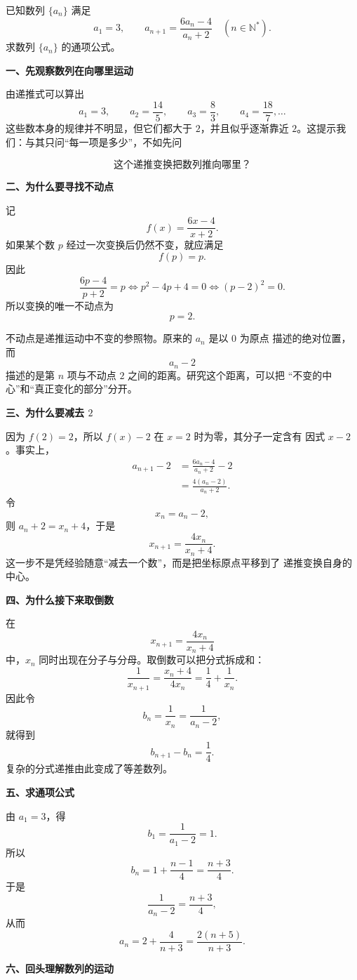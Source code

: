 \documentclass[zihao=-4]{exam-zh}
\begin{document}
\begin{question}[points=12]
已知数列 $\{a_n\}$ 满足
\[
 a_1=3,\qquad
 a_{n+1}=\frac{6a_n-4}{a_n+2}\quad(n\in\mathbb N^*).
\]
求数列 $\{a_n\}$ 的通项公式。

\begin{solution}
\textbf{一、先观察数列在向哪里运动}

由递推式可以算出
\[
 a_1=3,\qquad
 a_2=\frac{14}{5},\qquad
 a_3=\frac83,\qquad
 a_4=\frac{18}{7},\ldots
\]
这些数本身的规律并不明显，但它们都大于 $2$，并且似乎逐渐靠近
$2$。这提示我们：与其只问“每一项是多少”，不如先问

\[
 \text{这个递推变换把数列推向哪里？}
\]

\medskip
\textbf{二、为什么要寻找不动点}

记
\[
 f(x)=\frac{6x-4}{x+2}.
\]
如果某个数 $p$ 经过一次变换后仍然不变，就应满足
\[
 f(p)=p.
\]
因此
\[
 \frac{6p-4}{p+2}=p
 \iff p^2-4p+4=0
 \iff (p-2)^2=0.
\]
所以变换的唯一不动点为
\[
 \boxed{p=2}.
\]

不动点是递推运动中不变的参照物。原来的 $a_n$ 是以 $0$ 为原点
描述的绝对位置，而
\[
 a_n-2
\]
描述的是第 $n$ 项与不动点 $2$ 之间的距离。研究这个距离，可以把
“不变的中心”和“真正变化的部分”分开。

\medskip
\textbf{三、为什么要减去 $2$}

因为 $f(2)=2$，所以 $f(x)-2$ 在 $x=2$ 时为零，其分子一定含有
因式 $x-2$。事实上，
\[
\begin{aligned}
 a_{n+1}-2
 &=\frac{6a_n-4}{a_n+2}-2\\
 &=\frac{4(a_n-2)}{a_n+2}.
\end{aligned}
\]
令
\[
 x_n=a_n-2,
\]
则 $a_n+2=x_n+4$，于是
\[
 x_{n+1}=\frac{4x_n}{x_n+4}.
\]
这一步不是凭经验随意“减去一个数”，而是把坐标原点平移到了
递推变换自身的中心。

\medskip
\textbf{四、为什么接下来取倒数}

在
\[
 x_{n+1}=\frac{4x_n}{x_n+4}
\]
中，$x_n$ 同时出现在分子与分母。取倒数可以把分式拆成和：
\[
 \frac1{x_{n+1}}
 =\frac{x_n+4}{4x_n}
 =\frac14+\frac1{x_n}.
\]
因此令
\[
 b_n=\frac1{x_n}=\frac1{a_n-2},
\]
就得到
\[
 b_{n+1}-b_n=\frac14.
\]
复杂的分式递推由此变成了等差数列。

\medskip
\textbf{五、求通项公式}

由 $a_1=3$，得
\[
 b_1=\frac1{a_1-2}=1.
\]
所以
\[
 b_n=1+\frac{n-1}{4}=\frac{n+3}{4}.
\]
于是
\[
 \frac1{a_n-2}=\frac{n+3}{4},
\]
从而
\[
 \boxed{
 a_n=2+\frac4{n+3}
 =\frac{2(n+5)}{n+3}
 }.
\]

\medskip
\textbf{六、回头理解数列的运动}


\end{solution}
\end{question}
\end{document}
